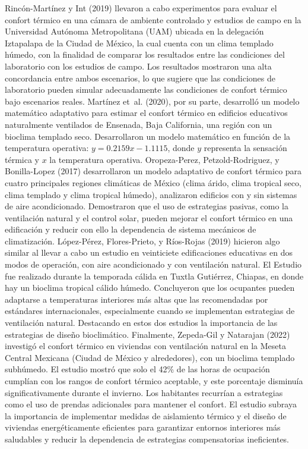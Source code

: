 \documentclass[
  12pt,
  letterpaper,
  DIV=11,
  numbers=noendperiod]{scrreport}
\begin{document}
Rincón-Martínez y Int (2019) llevaron a cabo experimentos para evaluar
el confort térmico en una cámara de ambiente controlado y estudios de
campo en la Universidad Autónoma Metropolitana (UAM) ubicada en la
delegación Iztapalapa de la Ciudad de México, la cual cuenta con un
clima templado húmedo, con la finalidad de comparar los resultados entre
las condiciones del laboratorio con los estudios de campo. Los
resultados mostraron una alta concordancia entre ambos escenarios, lo
que sugiere que las condiciones de laboratorio pueden simular
adecuadamente las condiciones de confort térmico bajo escenarios reales.
Martínez et~al. (2020), por su parte, desarrolló un modelo matemático
adaptativo para estimar el confort térmico en edificios educativos
naturalmente ventilados de Ensenada, Baja California, una región con un
bioclima templado seco. Desarrollaron un modelo matemático en función de
la temperatura operativa: \(𝑦 = 0.2159𝑥− 1.1115\), donde \(𝑦\)
representa la sensación térmica y \(𝑥\) la temperatura operativa.
Oropeza-Perez, Petzold-Rodriguez, y Bonilla-Lopez (2017) desarrollaron
un modelo adaptativo de confort térmico para cuatro principales regiones
climáticas de México (clima árido, clima tropical seco, clima templado y
clima tropical húmedo), analizaron edificios con y sin sistemas de aire
acondicionado. Demostraron que el uso de estrategias pasivas, como la
ventilación natural y el control solar, pueden mejorar el confort
térmico en una edificación y reducir con ello la dependencia de sistema
mecánicos de climatización. López-Pérez, Flores-Prieto, y Ríos-Rojas
(2019) hicieron algo similar al llevar a cabo un estudio en veinticiete
edificaciones educativas en dos modos de operación, con aire
acondicionado y con ventilación natural. El Estudio fue realizado
durante la temporada cálida en Tuxtla Gutiérrez, Chiapas, en donde hay
un bioclima tropical cálido húmedo. Concluyeron que los ocupantes pueden
adaptarse a temperaturas interiores más altas que las recomendadas por
estándares internacionales, especialmente cuando se implementan
estrategias de ventilación natural. Destacando en estos dos estudios la
importancia de las estrategias de diseño bioclimático. Finalmente,
Zepeda-Gil y Natarajan (2022) investigó el confort térmico en viviendas
con ventilación natural en la Meseta Central Mexicana (Ciudad de México
y alrededores), con un bioclima templado subhúmedo. El estudio mostró
que solo el 42\% de las horas de ocupación cumplían con los rangos de
confort térmico aceptable, y este porcentaje disminuía
significativamente durante el invierno. Los habitantes recurrían a
estrategias como el uso de prendas adicionales para mantener el confort.
El estudio subraya la importancia de implementar medidas de aislamiento
térmico y el diseño de viviendas energéticamente eficientes para
garantizar entornos interiores más saludables y reducir la dependencia
de estrategias compensatorias ineficientes.
\end{document}
